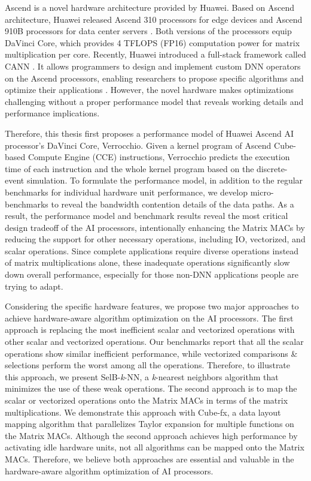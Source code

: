 Ascend \cite{DBLP:conf/hotchips/LiaoTXZ19} is a novel hardware architecture provided by Huawei. Based on Ascend architecture, Huawei released Ascend 310 processors for edge devices \cite{DBLP:conf/hotchips/LiaoTXZ19} and Ascend 910B processors for data center servers \cite{910}. Both versions of the processors equip DaVinci Core, which provides 4 TFLOPS (FP16) computation power for matrix multiplication per core. Recently, Huawei introduced a full-stack framework called CANN \cite{CANN}. It allows programmers to design and implement custom DNN operators on the Ascend processors, enabling researchers to propose specific algorithms and optimize their applications \cite{DBLP:conf/ipps/RohwedderCAACW21, DBLP:conf/icpp/JiW21}. However, the novel hardware makes optimizations challenging without a proper performance model that reveals working details and performance implications.

Therefore, this thesis first proposes a performance model of Huawei Ascend AI processor's DaVinci Core, Verrocchio. Given a kernel program of Ascend Cube-based Compute Engine (CCE) instructions, Verrocchio predicts the execution time of each instruction and the whole kernel program based on the discrete-event simulation. To formulate the performance model, in addition to the regular benchmarks for individual hardware unit performance, we develop micro-benchmarks to reveal the bandwidth contention details of the data paths. As a result, the performance model and benchmark results reveal the most critical design tradeoff of the AI processors, intentionally enhancing the Matrix MACs by reducing the support for other necessary operations, including IO, vectorized, and scalar operations. Since complete applications require diverse operations instead of matrix multiplications alone, these inadequate operations significantly slow down overall performance, especially for those non-DNN applications people are trying to adapt.

Considering the specific hardware features, we propose two major approaches to achieve hardware-aware algorithm optimization on the AI processors. The first approach is replacing the most inefficient scalar and vectorized operations with other scalar and vectorized operations. Our benchmarks report that all the scalar operations show similar inefficient performance, while vectorized comparisons \& selections perform the worst among all the operations. Therefore, to illustrate this approach, we present SelB-\textit{k}-NN, a \textit{k}-nearest neighbors algorithm that minimizes the use of these weak operations. The second approach is to map the scalar or vectorized operations onto the Matrix MACs in terms of the matrix multiplications. We demonstrate this approach with Cube-fx, a data layout mapping algorithm that parallelizes Taylor expansion for multiple functions on the Matrix MACs. Although the second approach achieves high performance by activating idle hardware units, not all algorithms can be mapped onto the Matrix MACs. Therefore, we believe both approaches are essential and valuable in the hardware-aware algorithm optimization of AI processors.


